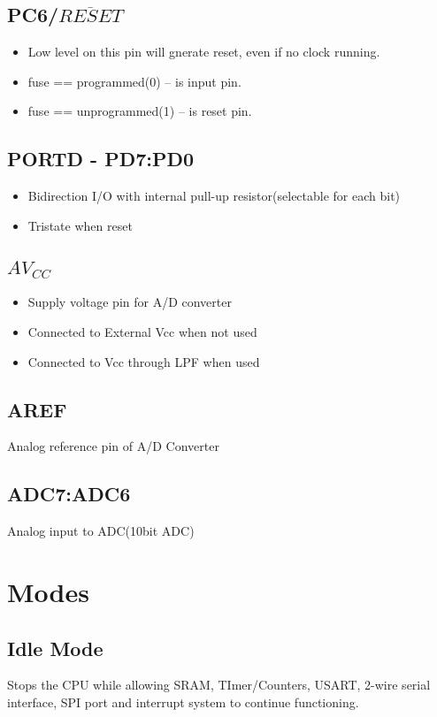 \subsection{PC6/\texorpdfstring{$\overline{RESET}$}{}}
\begin{itemize}
    \item Low level on this pin will gnerate reset, even if no clock running.
    \item {} fuse == programmed(0) --  is input pin.
    \item {} fuse == unprogrammed(1) --  is reset pin.
\end{itemize}

\subsection{PORTD - PD7:PD0}
\begin{itemize}
    \item Bidirection I/O with internal pull-up resistor(selectable for each bit)
    \item Tristate when reset
\end{itemize}

\subsection{\texorpdfstring{$AV_{CC}$}{}}
\begin{itemize}
    \item Supply voltage pin for A/D converter
    \item Connected to External Vcc when not used
    \item Connected to Vcc through LPF when used
\end{itemize}

\subsection{AREF}
\quad Analog reference pin of A/D Converter

\subsection{ADC7:ADC6}
\quad Analog input to ADC(10bit ADC)


\section{Modes}
\subsection{Idle Mode}
\quad Stops the CPU while allowing SRAM, TImer/Counters, USART, 2-wire serial interface, SPI port and interrupt system to continue functioning.

